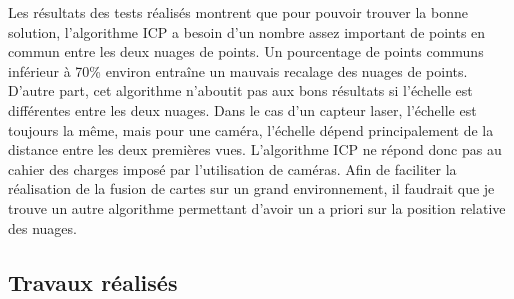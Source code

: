 Les résultats des tests réalisés montrent que pour pouvoir trouver la bonne solution, l'algorithme ICP a besoin d'un nombre assez important de points en commun entre les deux nuages de points.
Un pourcentage de points communs inférieur à 70\% environ entraîne un mauvais recalage des nuages de points. 
D'autre part, cet algorithme n'aboutit pas aux bons résultats si l'échelle est différentes entre les deux nuages.
Dans le cas d'un capteur laser, l'échelle est toujours la même, mais pour une caméra, l'échelle dépend principalement de la distance entre les deux premières vues.
L'algorithme ICP ne répond donc pas au cahier des charges imposé par l'utilisation de caméras.
Afin de faciliter la réalisation de la fusion de cartes sur un grand environnement, il faudrait que je trouve un autre algorithme permettant d'avoir un a priori sur la position relative des nuages.

\subsection{Travaux réalisés}

